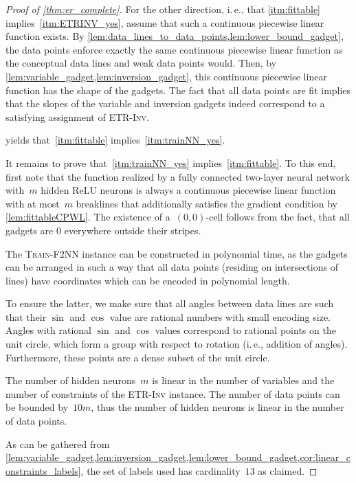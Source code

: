 \documentclass[11pt]{article}
\numberwithin{equation}{section}
\theoremstyle{definition}
\theoremstyle{plain}
\newcommand{\ie}{i.\,e.}
\newcommand{\problemname}[1]{\textnormal{\textsc{#1}}\xspace}
\newcommand{\trainNN}{\problemname{Train-F2NN}}
\newcommand{\ETRINV}{\problemname{ETR-Inv}}
\newcommand{\fullyconnected}{fully connected\xspace}
\newcommand{\twolayer}{two-layer\xspace}
\newcommand{\ReLU}{\ensuremath{\mathrm{ReLU}}\xspace}
\newcommand{\CPWL}{continuous piecewise linear\xspace}
\theoremstyle{plain}
\begin{document}
\begin{proof}[Proof of \cref{thm:er_complete}]
    For the other direction, \ie, that \ref{itm:fittable} implies~\ref{itm:ETRINV_yes}, assume that such a \CPWL function exists.
    By \cref{lem:data_lines_to_data_points,lem:lower_bound_gadget}, the data points enforce exactly the same \CPWL function as the conceptual data lines and weak data points would.
    Then, by \cref{lem:variable_gadget,lem:inversion_gadget}, this \CPWL function has the shape of the gadgets.
    The fact that all data points are fit implies that the slopes of the variable and inversion gadgets indeed correspond to a satisfying assignment of \ETRINV.

     yields that~\ref{itm:fittable} implies~\ref{itm:trainNN_yes}.

    It remains to prove that~\ref{itm:trainNN_yes} implies~\ref{itm:fittable}.
    To this end, first note that the function realized by a \fullyconnected \twolayer neural network with~$m$ hidden \ReLU neurons is always a \CPWL function with at most~$m$ breaklines that additionally satisfies the gradient condition by \cref{lem:fittableCPWL}.
    The existence of a~$(0,0)$-cell follows from the fact, that all gadgets are
%
$0$ everywhere  %
outside their stripes.

    \medskip
    \noindent
    The \trainNN instance can be constructed in polynomial time, as the gadgets can be arranged in such a way that all data points (residing on intersections of lines) have coordinates which can be encoded in polynomial length.

    To ensure the latter, we make sure that all angles between data lines are such that their $\sin$ and $\cos$ value are rational numbers with small encoding size.
    Angles with rational $\sin$ and $\cos$ values correspond to rational points on the unit circle, which form a group with respect to rotation (\ie, addition of angles). 
    Furthermore, these points are a dense subset of the unit circle.

    The number of hidden neurons~$m$ is linear in the number of variables and the number of constraints of the \ETRINV instance.
    The number of data points can be bounded by~$10m$, thus the number of hidden neurons is linear in the number of data points.

    As can be gathered from \cref{lem:variable_gadget,lem:inversion_gadget,lem:lower_bound_gadget,cor:linear_constraints_labels}, the set of %
labels used  %
has cardinality~$13$ as claimed.
\end{proof}
\end{document}

